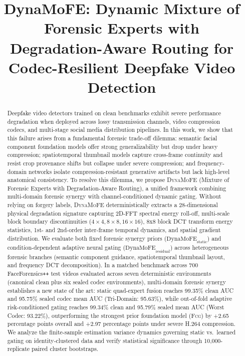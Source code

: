 \documentclass[conference]{IEEEtran}
\newcommand{\fcg}{\textsc{Fcg}}
\newcommand{\dynamofe}{\textsc{DynaMoFE}}
\newcommand{\ffpp}{FaceForensics\texttt{++}}
\newcommand{\auc}{AUC}
\begin{document}
\title{DynaMoFE: Dynamic Mixture of Forensic Experts with Degradation-Aware Routing for Codec-Resilient Deepfake Video Detection}

\author{
}

\maketitle

\begin{abstract}
Deepfake video detectors trained on clean benchmarks exhibit severe performance degradation when deployed across lossy transmission channels, video compression codecs, and multi-stage social media distribution pipelines. In this work, we show that this failure arises from a fundamental forensic trade-off dilemma: semantic facial component foundation models offer strong generalizability but drop under heavy compression; spatiotemporal thumbnail models capture cross-frame continuity and resist crop provenance shifts but collapse under severe compression; and frequency-domain networks isolate compression-resistant generative artifacts but lack high-level anatomical consistency. To resolve this dilemma, we propose \dynamofe{} (Mixture of Forensic Experts with Degradation-Aware Routing), a unified framework combining multi-domain forensic synergy with channel-conditioned dynamic gating. Without relying on forgery labels, \dynamofe{} deterministically extracts a 28-dimensional physical degradation signature capturing 2D-FFT spectral energy roll-off, multi-scale block boundary discontinuities ($4\times4, 8\times8, 16\times16$), 8x8 block DCT transform energy statistics, 1st- and 2nd-order inter-frame temporal dynamics, and spatial gradient distribution. We evaluate both fixed forensic synergy priors ($\text{DynaMoFE}_{\text{static}}$) and condition-dependent adaptive neural gating ($\text{DynaMoFE}_{\text{residual}}$) across heterogeneous forensic branches (semantic component guidance, spatiotemporal thumbnail layout, and frequency DCT decomposition). In a matched benchmark across 700 \ffpp{} test videos evaluated across seven deterministic environments (canonical clean plus six sealed codec environments), multi-domain forensic synergy establishes a new state of the art: static quad-expert fusion reaches 99.35\% clean \auc{} and 95.75\% sealed codec mean \auc{} (Tri-Domain: 95.63\%), while out-of-fold adaptive risk-conditioned gating reaches 99.34\% clean and 95.79\% sealed mean \auc{} (Worst Codec: 93.22\%), outperforming the strongest prior foundation model (\fcg{}) by +2.65 percentage points overall and +2.97 percentage points under severe H.264 compression. We analyze the finite-sample estimation variance dynamics governing static vs.\ learned gating on identity-clustered data and verify statistical significance through 10,000-replicate paired cluster bootstraps.
\end{abstract}
\end{document}
